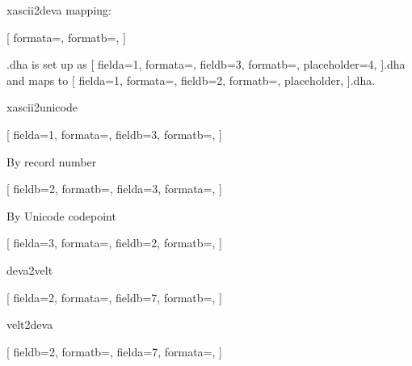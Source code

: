 \documentclass{article}
\begin{document}
xascii2deva mapping:

\setlength{\columnseprule}{0.4pt}
\begin{multicols}{4}
[
formata=,
formatb=\fdevb\Large,
]
\end{multicols}


.dha is set up as 
[
fielda=1,
formata=,
fieldb=3,
formatb=\small,
placeholder=4,
]{.dha}
and maps to
[
fielda=1,
formata=,
fieldb=2,
formatb=\fdevb,
placeholder,
]{.dha}.


\newpage
xascii2unicode

[
fielda=1,
formata=,
fieldb=3,
formatb=\small,
]


\newpage
By record number


[
fieldb=2,
formatb=\fdevb\Large,
fielda=3,
formata=\small,
]



\newpage
By Unicode codepoint


[
fielda=3,
formata=\small,
fieldb=2,
formatb=\fdevb\huge\color{blue},
]

\newpage
deva2velt


\begin{multicols}{4}
[
fielda=2,
formata=\fdevb,
fieldb=7,
formatb=\small,
]
\end{multicols}

\newpage
velt2deva



\begin{multicols}{4}
[
fieldb=2,
formatb=\fdevb,
fielda=7,
formata=\small,
]
\end{multicols}
\end{document}
